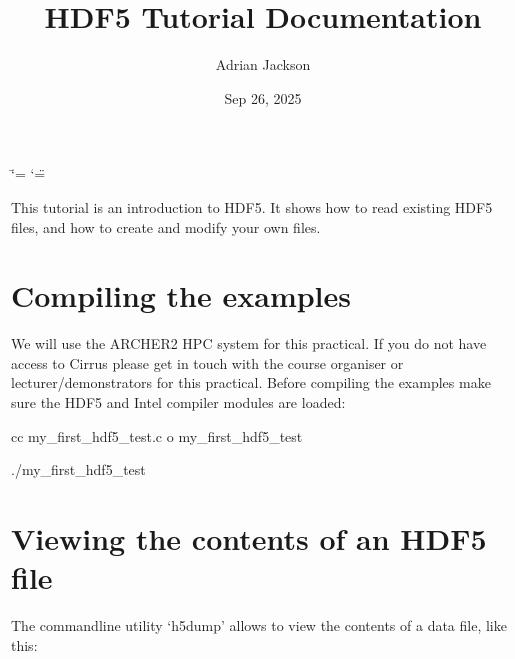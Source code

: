 \documentclass[letterpaper,10pt,english]{sphinxmanual}
\title{HDF5 Tutorial Documentation}
\date{Sep 26, 2025}
\author{Adrian Jackson}
\begin{document}
\ifdefined\shorthandoff
  \ifnum\catcode`\=\string=\active\shorthandoff{=}\fi
  \ifnum\catcode`\"=\active{}\fi
\fi

\pagestyle{empty}
\sphinxmaketitle
\pagestyle{plain}
\sphinxtableofcontents
\pagestyle{normal}
\label{\detokenize{index::doc}}


\sphinxAtStartPar
This tutorial is an introduction to HDF5. It shows how to read existing HDF5 files, and how to create and modify your own files.


\chapter{Compiling the examples}
\label{\detokenize{index:compiling-the-examples}}
\sphinxAtStartPar
We will use the ARCHER2 HPC system for this practical. If you do not have access to Cirrus please get in touch with the course organiser or lecturer/demonstrators for this practical.
Before compiling the examples make sure the HDF5 and Intel compiler modules are loaded:

\begin{sphinxVerbatim}[commandchars=\\\{\}]
   
  
\end{sphinxVerbatim}
\begin{description}
\sphinxAtStartPar
cc my\_first\_hdf5\_test.c \sphinxhyphen{}o my\_first\_hdf5\_test

\sphinxAtStartPar
./my\_first\_hdf5\_test

\end{description}


\chapter{Viewing the contents of an HDF5 file}
\label{\detokenize{index:viewing-the-contents-of-an-hdf5-file}}
\sphinxAtStartPar
The commandline utility ‘h5dump’ allows to view the contents of a data file, like this:

\begin{sphinxVerbatim}[commandchars=\\\{\}]
 
\end{sphinxVerbatim}
\end{document}

